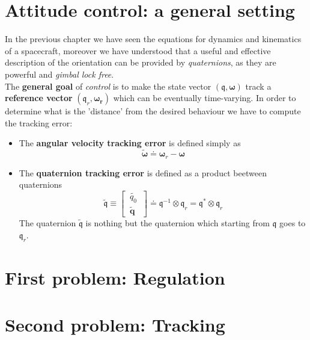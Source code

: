\section{Attitude control: a general setting}
In the previous chapter we have seen the equations for dynamics and kinematics of a spacecraft, moreover we have understood that a useful and effective description of the orientation can be provided by  \textit{quaternions}, as they are powerful and \textit{gimbal lock free}.\\
The \textbf{general goal} of \textit{control} is to make the state vector $(\mathfrak{q}, \boldsymbol{\omega})$ track a \textbf{reference vector} $(\mathfrak{q}_r, \boldsymbol{\omega_r})$ which can be eventually time-varying. In order to determine what is the 'distance' from the desired behaviour we have to compute the tracking error:
\begin{itemize}
    \item The \textbf{angular velocity tracking error} is defined simply as
    \begin{equation*}
        \tilde{\boldsymbol{\omega}} \doteq \boldsymbol{\omega}_r - \boldsymbol{\omega}
    \end{equation*}
    \item The \textbf{quaternion tracking error} is defined as a product beetween quaternions
    \begin{equation*}
        \tilde{\mathfrak{q}} \equiv \begin{bmatrix}
          \   \tilde{q_0} \ \\\ \tilde{\mathbf{q}} \
        \end{bmatrix} \doteq \mathfrak{q}^{-1} \otimes \mathfrak{q}_r = \mathfrak{q}^* \otimes \mathfrak{q}_r
    \end{equation*}
    The quaternion $\tilde{\mathfrak{q}}$ is nothing but the quaternion which starting from $\mathfrak{q}$ goes to $\mathfrak{q}_r$. 
\end{itemize}

\section{First problem: Regulation}

\section{Second problem: Tracking}
